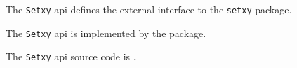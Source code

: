 
The {\tt Setxy} api defines the external interface to the {\tt setxy} package.

The {\tt Setxy} api is implemented by the  package.

The {\tt Setxy} api source code is .
